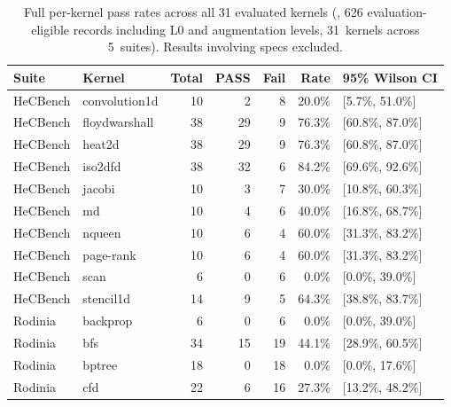
\begin{table}[!htbp]
\centering
\caption{Full per-kernel pass rates across all 31 evaluated kernels (\qwenshort{}, 626 evaluation-eligible records including L0 and augmentation levels, 31~kernels across 5~suites). Results involving \knownfail{} specs excluded.}
\label{tab:per-kernel-full}
\footnotesize
\begin{tabular}{@{}llrrrrl@{}}
\toprule
Suite & Kernel & Total & PASS & Fail & Rate & 95\% Wilson CI \\
\midrule
HeCBench & convolution1d & 10 & 2 & 8 & 20.0\% & [5.7\%, 51.0\%] \\
HeCBench & floydwarshall & 38 & 29 & 9 & 76.3\% & [60.8\%, 87.0\%] \\
HeCBench & heat2d & 38 & 29 & 9 & 76.3\% & [60.8\%, 87.0\%] \\
HeCBench & iso2dfd & 38 & 32 & 6 & 84.2\% & [69.6\%, 92.6\%] \\
HeCBench & jacobi & 10 & 3 & 7 & 30.0\% & [10.8\%, 60.3\%] \\
HeCBench & md & 10 & 4 & 6 & 40.0\% & [16.8\%, 68.7\%] \\
HeCBench & nqueen & 10 & 6 & 4 & 60.0\% & [31.3\%, 83.2\%] \\
HeCBench & page-rank & 10 & 6 & 4 & 60.0\% & [31.3\%, 83.2\%] \\
HeCBench & scan & 6 & 0 & 6 & 0.0\% & [0.0\%, 39.0\%] \\
HeCBench & stencil1d & 14 & 9 & 5 & 64.3\% & [38.8\%, 83.7\%] \\
\midrule
Rodinia & backprop & 6 & 0 & 6 & 0.0\% & [0.0\%, 39.0\%] \\
Rodinia & bfs & 34 & 15 & 19 & 44.1\% & [28.9\%, 60.5\%] \\
Rodinia & bptree & 18 & 0 & 18 & 0.0\% & [0.0\%, 17.6\%] \\
Rodinia & cfd & 22 & 6 & 16 & 27.3\% & [13.2\%, 48.2\%] \\

\end{tabular}
\end{table}
